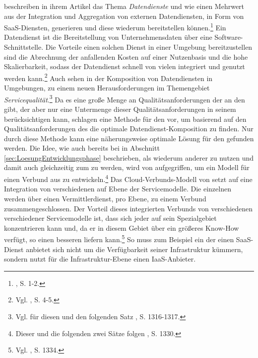 \cite{Carey.2012} beschreiben in ihrem Artikel das Thema \emph{Datendienste} und wie \CSU einen Mehrwert aus der Integration und Aggregation von externen Datendiensten, in Form von \acs{SaaS}-Diensten, generieren und diese wiederum bereitstellen können.\footnote{\cite{Carey.2012}, S. 1-2.}
Ein Datendienst ist die Bereitstellung von Unternehmensdaten über eine Software-Schnittstelle. Die Vorteile einen solchen Dienst in einer \CC Umgebung bereitzustellen sind die Abrechnung der anfallenden Kosten auf einer Nutzenbasis und die hohe Skalierbarkeit, sodass der Datendienst schnell von vielen \CSUn integriert und genutzt werden kann.\footnote{Vgl. \cite{Carey.2012}, S. 4-5.}
\newline
Auch \cite{Qi.2012} sehen in der Komposition von Datendiensten in \CC Umgebungen, zu einem neuen \CSComma Herausforderungen im Themengebiet \emph{Servicequalität}.\footnote{Vgl. für diesen und den folgenden Satz \cite{Qi.2012}, S. 1316-1317.}
Da es eine große Menge an Qualitätsanforderungen der \CSU an den \CS gibt, der \CSP aber nur eine Untermenge dieser Qualitätsanforderungen in seinem \CS berücksichtigen kann, schlagen \cite{Qi.2012} eine Methode für den \CSU vor, um basierend auf den Qualitätsanforderungen des \CSUs die optimale Datendienst-Komposition zu finden. Nur durch diese Methode kann eine näherungsweise optimale Lösung für den \CSU gefunden werden.
\newline
Die Idee, wie auch bereits bei \cite{Wu.2012} in Abschnitt \ref{sec:LoesungEntwicklungsphase} beschrieben, als \CSP wiederum \CSs anderer \CSP zu nutzen und damit auch gleichzeitig zum \CSU zu werden, wird von \cite{Villegas.2012} aufgegriffen, um ein Modell für einen Verbund aus \CSs zu entwickeln.\footnote{Dieser und die folgenden zwei Sätze folgen \cite{Villegas.2012}, S. 1330.}
Das Cloud-Verbunds-Modell von \cite{Villegas.2012} setzt auf eine Integration von verschiedenen \CSs auf Ebene der Servicemodelle. Die einzelnen \CSs werden über einen Vermittlerdienst, pro Ebene, zu einem \CC Verbund zusammengeschlossen. 
Der Vorteil dieses integrierten Verbunds von verschiedenen \CSPn verschiedener Servicemodelle ist, dass sich jeder \CSP auf sein Spezialgebiet konzentrieren kann und, da er in diesem Gebiet über ein größeres Know-How verfügt, so einen besseren \CS liefern kann.\footnote{Vgl. \cite{Villegas.2012}, S. 1334.}
So muss zum Beispiel ein \CSP der einen \acs{SaaS}-Dienst anbietet sich nicht um die Verfügbarkeit seiner Infrastruktur kümmern, sondern nutzt für die Infrastruktur-Ebene einen \acs{IaaS}-Anbieter.
